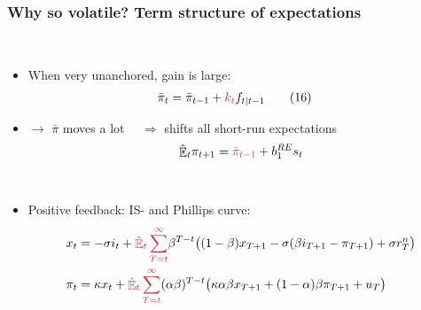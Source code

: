 \documentclass[10pt]{beamer}
\DeclareMathOperator{\E}{\mathbb{E}}
\begin{document}
\begin{frame}
	\frametitle{Why so volatile? Term structure of expectations}
	
\

\begin{itemize}
\item[] When very unanchored, gain is large:
\begin{align*}
\bar{\pi}_{t}  & =\bar{\pi}_{t-1} +\textcolor{brownreddark}{k_t}  f_{t|t-1} \tag{16} 
\end{align*}
\item[] $\rightarrow$ $\bar{\pi}$ moves a lot
\pause $\quad \Rightarrow$ shifts all short-run expectations
\begin{equation*}
\hat{\E}_t \pi_{t+1} = \textcolor{brownreddark}{\bar{\pi}_{t-1}} + b_1^{RE}s_t
\end{equation*}

\
\pause
\item[] Positive feedback: IS- and Phillips curve:	
 \begin{align*}
x_t &=  -\sigma i_t +\textcolor{brownreddark}{\hat{\E}_t \sum_{T=t}^{\infty}} \beta^{T-t }\big( (1-\beta)x_{T+1} - \sigma(\beta i_{T+1} - \pi_{T+1}) +\sigma r_T^n \big)   \\
\pi_t &= \kappa x_t +\textcolor{brownreddark}{\hat{\E}_t \sum_{T=t}^{\infty}} (\alpha\beta)^{T-t }\big( \kappa \alpha \beta x_{T+1} + (1-\alpha)\beta \pi_{T+1} + u_T\big) 
\end{align*}


\end{itemize}



\end{frame}
\end{document}
